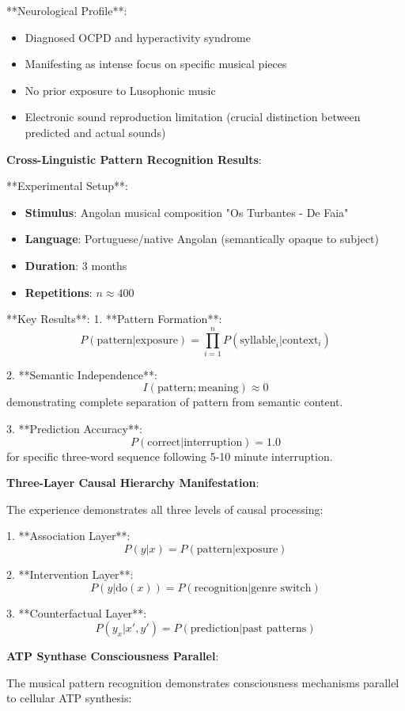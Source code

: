 \documentclass[12pt,a4paper]{article}
\begin{document}
**Neurological Profile**:
\begin{itemize}
\item Diagnosed OCPD and hyperactivity syndrome
\item Manifesting as intense focus on specific musical pieces
\item No prior exposure to Lusophonic music
\item Electronic sound reproduction limitation (crucial distinction between predicted and actual sounds)
\end{itemize}

\textbf{Cross-Linguistic Pattern Recognition Results}:

**Experimental Setup**:
\begin{itemize}
\item \textbf{Stimulus}: Angolan musical composition "Os Turbantes - De Faia"
\item \textbf{Language}: Portuguese/native Angolan (semantically opaque to subject)
\item \textbf{Duration}: 3 months
\item \textbf{Repetitions}: $n \approx 400$
\end{itemize}

**Key Results**:
1. **Pattern Formation**:
$$P(\text{pattern}|\text{exposure}) = \prod_{i=1}^n P(\text{syllable}_i|\text{context}_i)$$

2. **Semantic Independence**:
$$I(\text{pattern}; \text{meaning}) \approx 0$$
demonstrating complete separation of pattern from semantic content.

3. **Prediction Accuracy**:
$$P(\text{correct}|\text{interruption}) = 1.0$$
for specific three-word sequence following 5-10 minute interruption.

\textbf{Three-Layer Causal Hierarchy Manifestation}:

The experience demonstrates all three levels of causal processing:

1. **Association Layer**:
$$P(y|x) = P(\text{pattern}|\text{exposure})$$

2. **Intervention Layer**:
$$P(y|\text{do}(x)) = P(\text{recognition}|\text{genre switch})$$

3. **Counterfactual Layer**:
$$P(y_x|x', y') = P(\text{prediction}|\text{past patterns})$$

\textbf{ATP Synthase Consciousness Parallel}:

The musical pattern recognition demonstrates consciousness mechanisms parallel to cellular ATP synthesis:
\end{document}
